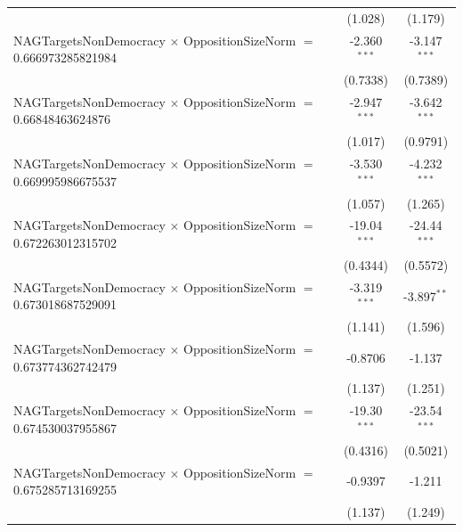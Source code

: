 \begin{tabular}{lcc}
                                                                                & (1.028)              & (1.179)\\   
   NAGTargetsNonDemocracy $\times$ OppositionSizeNorm $=$ 0.666973285821984     & -2.360$^{***}$       & -3.147$^{***}$\\   
                                                                                & (0.7338)             & (0.7389)\\   
   NAGTargetsNonDemocracy $\times$ OppositionSizeNorm $=$ 0.66848463624876      & -2.947$^{***}$       & -3.642$^{***}$\\   
                                                                                & (1.017)              & (0.9791)\\   
   NAGTargetsNonDemocracy $\times$ OppositionSizeNorm $=$ 0.669995986675537     & -3.530$^{***}$       & -4.232$^{***}$\\   
                                                                                & (1.057)              & (1.265)\\   
   NAGTargetsNonDemocracy $\times$ OppositionSizeNorm $=$ 0.672263012315702     & -19.04$^{***}$       & -24.44$^{***}$\\   
                                                                                & (0.4344)             & (0.5572)\\   
   NAGTargetsNonDemocracy $\times$ OppositionSizeNorm $=$ 0.673018687529091     & -3.319$^{***}$       & -3.897$^{**}$\\   
                                                                                & (1.141)              & (1.596)\\   
   NAGTargetsNonDemocracy $\times$ OppositionSizeNorm $=$ 0.673774362742479     & -0.8706              & -1.137\\   
                                                                                & (1.137)              & (1.251)\\   
   NAGTargetsNonDemocracy $\times$ OppositionSizeNorm $=$ 0.674530037955867     & -19.30$^{***}$       & -23.54$^{***}$\\   
                                                                                & (0.4316)             & (0.5021)\\   
   NAGTargetsNonDemocracy $\times$ OppositionSizeNorm $=$ 0.675285713169255     & -0.9397              & -1.211\\   
                                                                                & (1.137)              & (1.249)\\   

\end{tabular}
